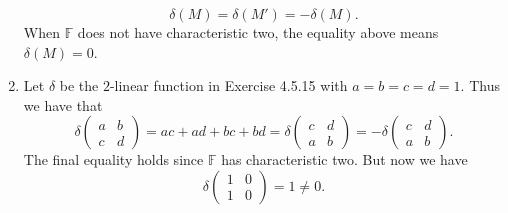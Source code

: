 \begin{enumerate}
\[\delta(M)=\delta(M')=-\delta(M).\]
When $\mathbb{F}$ does not have characteristic two, the equality above means $\delta(M)=0$.
\item Let $\delta $ be the $2$-linear function in Exercise 4.5.15 with $a=b=c=d=1$. Thus we have that 
\[\delta\begin{pmatrix}a&b\\c&d\end{pmatrix}=ac+ad+bc+bd=\delta\begin{pmatrix}c&d\\a&b\end{pmatrix}=-\delta\begin{pmatrix}c&d\\a&b\end{pmatrix}.\]
The final equality holds since $\mathbb{F}$ has characteristic two. But now we have 
\[\delta\begin{pmatrix}1&0\\1&0\end{pmatrix}=1\neq 0.\]
\end{enumerate}
